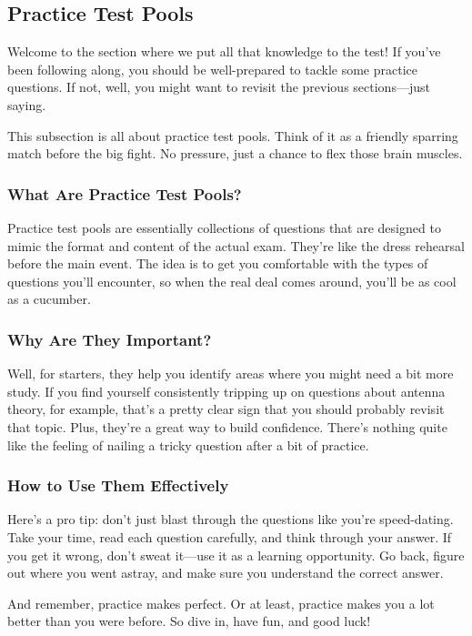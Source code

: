 \subsection{Practice Test Pools}
\label{subsec:practice-pools}

Welcome to the section where we put all that knowledge to the test! If you've been following along, you should be well-prepared to tackle some practice questions. If not, well, you might want to revisit the previous sections—just saying. 

This subsection is all about practice test pools. Think of it as a friendly sparring match before the big fight. No pressure, just a chance to flex those brain muscles. 

\subsubsection*{What Are Practice Test Pools?}

Practice test pools are essentially collections of questions that are designed to mimic the format and content of the actual exam. They’re like the dress rehearsal before the main event. The idea is to get you comfortable with the types of questions you’ll encounter, so when the real deal comes around, you’ll be as cool as a cucumber.

\subsubsection*{Why Are They Important?}

Well, for starters, they help you identify areas where you might need a bit more study. If you find yourself consistently tripping up on questions about antenna theory, for example, that’s a pretty clear sign that you should probably revisit that topic. Plus, they’re a great way to build confidence. There’s nothing quite like the feeling of nailing a tricky question after a bit of practice.

\subsubsection*{How to Use Them Effectively}

Here’s a pro tip: don’t just blast through the questions like you’re speed-dating. Take your time, read each question carefully, and think through your answer. If you get it wrong, don’t sweat it—use it as a learning opportunity. Go back, figure out where you went astray, and make sure you understand the correct answer. 

And remember, practice makes perfect. Or at least, practice makes you a lot better than you were before. So dive in, have fun, and good luck!

